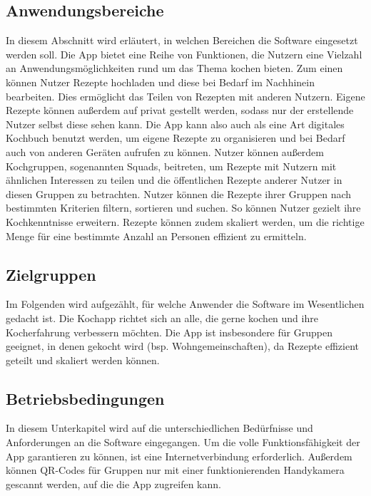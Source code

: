 \documentclass[parskip=full]{scrartcl}
\begin{document}
\subsection{Anwendungsbereiche}
In diesem Abschnitt wird erläutert, in welchen Bereichen die Software eingesetzt werden soll. \newline
Die App bietet eine Reihe von Funktionen, die Nutzern eine Vielzahl an Anwendungsmöglichkeiten rund um das Thema kochen bieten. 
Zum einen können Nutzer Rezepte hochladen und diese bei Bedarf im Nachhinein bearbeiten. 
Dies ermöglicht das Teilen von Rezepten mit anderen Nutzern. Eigene Rezepte können außerdem auf privat gestellt werden, sodass nur der erstellende Nutzer selbst diese sehen kann.
Die App kann also auch als eine Art digitales Kochbuch benutzt werden, um eigene Rezepte zu organisieren und bei Bedarf auch von anderen Geräten aufrufen zu können.  
Nutzer können außerdem Kochgruppen, sogenannten Squads, beitreten, um Rezepte mit Nutzern mit ähnlichen Interessen zu teilen und die öffentlichen Rezepte anderer Nutzer in diesen Gruppen zu betrachten. Nutzer können die Rezepte ihrer Gruppen nach bestimmten Kriterien filtern, sortieren und suchen. So können Nutzer gezielt ihre Kochkenntnisse erweitern.
Rezepte können zudem skaliert werden, um die richtige Menge für eine bestimmte Anzahl an Personen effizient zu ermitteln. 

\subsection{Zielgruppen}
Im Folgenden wird aufgezählt, für welche Anwender die Software im Wesentlichen gedacht ist. \newline
Die Kochapp richtet sich an alle, die gerne kochen und ihre Kocherfahrung verbessern möchten. 
Die App ist insbesondere für Gruppen geeignet, in denen gekocht wird (bsp. Wohngemeinschaften), da Rezepte effizient geteilt und skaliert werden können.

\subsection{Betriebsbedingungen}
In diesem Unterkapitel wird auf die unterschiedlichen Bedürfnisse und Anforderungen an die Software eingegangen. \newline
Um die volle Funktionsfähigkeit der App garantieren zu können, ist eine Internetverbindung erforderlich. Außerdem können QR-Codes für Gruppen nur mit einer funktionierenden Handykamera gescannt werden, auf die die App zugreifen kann.
\end{document}
